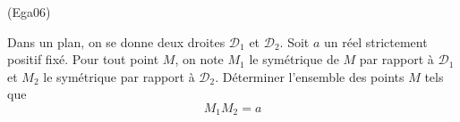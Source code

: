 \begin{tiny}(Ega06)\end{tiny} Dans un plan, on se donne deux droites $\mathcal D_1$ et $\mathcal D_2$. Soit $a$ un réel strictement positif fixé. Pour tout point $M$, on note $M_1$ le symétrique de $M$ par rapport à $\mathcal D_1$ et $M_2$ le symétrique par rapport à $\mathcal D_2$.\newline
Déterminer l'ensemble des points $M$ tels que 
\begin{displaymath}
 M_1M_2 = a
\end{displaymath}